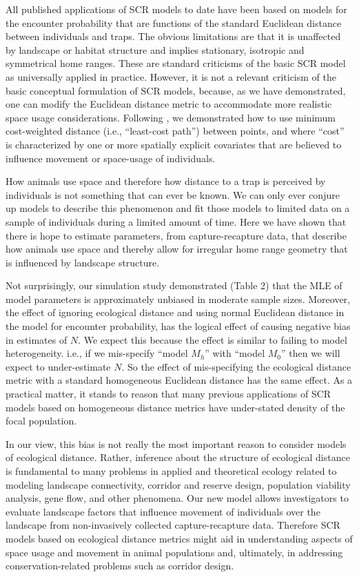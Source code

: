 All published applications of SCR models to date have been based on models for the
encounter probability that are functions of the standard Euclidean
distance between individuals and traps. The obvious limitations are
that it is unaffected by landscape or habitat structure and implies
stationary, isotropic and symmetrical home ranges. These are standard
criticisms of the basic SCR model as universally applied in
practice. However, it is not a relevant criticism of the basic
conceptual formulation of SCR models, because, as we have
demonstrated, one can modify the Euclidean distance metric to
accommodate more realistic space usage considerations.  Following
\citet{royle_etal:2012ecol},
we demonstrated how to use
minimum cost-weighted distance (i.e., ``least-cost
path'') between points, and where ``cost'' is characterized by one or
more spatially explicit covariates that are believed to influence
movement or space-usage of individuals.

How animals use space and therefore how distance to a trap is
perceived by individuals is not something that can ever be known. We
can only ever conjure up models to describe this phenomenon and fit
those models to limited data on a sample of individuals during a
limited amount of time.  Here we have shown that there is hope to
estimate parameters, from capture-recapture data, that describe how
animals use space and thereby allow for irregular home range geometry
that is influenced by landscape structure.

Not surprisingly, our simulation study demonstrated
(Table 2) that the MLE of model parameters is
approximately unbiased in moderate sample sizes. Moreover, the effect
of ignoring ecological distance and using normal Euclidean distance in
the model for encounter probability, has the logical effect of causing
negative bias in estimates of $N$.  We expect this because the effect
is similar to failing to model heterogeneity. i.e., if we mis-specify
``model $M_h$'' \citep{otis_etal:1978} with ``model $M_0$''
\citep{otis_etal:1978} then we will expect to under-estimate $N$. So
the effect of mis-specifying the ecological distance metric with a
standard homogeneous Euclidean distance has the same effect. As a
practical matter, it stands to reason that many previous applications
of SCR models based on homogeneous distance metrics have under-stated
density of the focal population.

In our view, this bias is not really the most important reason to
consider models of ecological distance. Rather, inference about the
structure of ecological distance is fundamental to many problems in
applied and theoretical ecology related to modeling landscape
connectivity, corridor and reserve design, population viability
analysis, gene flow, and other phenomena.  Our new model allows
investigators to evaluate landscape factors that influence movement of
individuals over the landscape from non-invasively collected
capture-recapture data.  Therefore SCR models based on ecological
distance metrics might aid in understanding
aspects of space usage and movement in animal populations and, ultimately, in addressing conservation-related problems such as corridor design.


